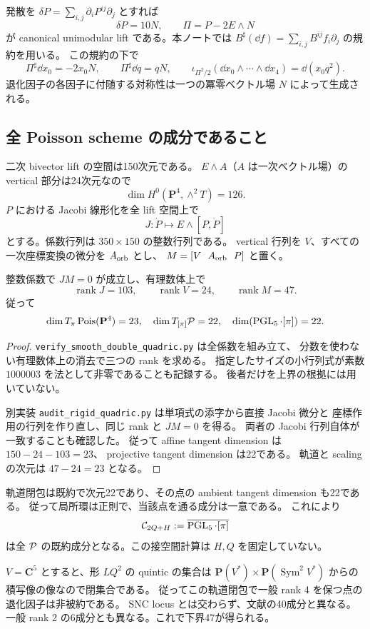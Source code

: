 \documentclass[11pt,a4paper]{ltjsarticle}
\newcommand{\PP}{\mathbf P}\renewcommand{\AA}{\mathbf A}\newcommand{\CC}{\mathbf C}\newcommand{\QQ}{\mathbf Q}
\DeclareMathOperator{\Pois}{Pois}\DeclareMathOperator{\rank}{rank}\DeclareMathOperator{\Spec}{Spec}
\DeclareMathOperator{\Sym}{Sym}
\theoremstyle{remark}\newtheorem{remark}[theorem]{注意}\renewcommand{\proofname}{証明}
\begin{document}
発散を $\delta P=\sum_{i,j}\partial_iP^{ij}\partial_j$ とすれば
\[
 \delta P=10N,\qquad \Pi=P-2E\wedge N
\]
が canonical unimodular lift である。本ノートでは
$B^\sharp(\dd f)=\sum_{i,j}B^{ij}f_i\partial_j$ の規約を用いる。
この規約の下で
\[
 \Pi^\sharp\dd x_0=-2x_0N,\qquad
 \Pi^\sharp\dd q=qN,\qquad
 \iota_{\Pi^2/2}(\dd x_0\wedge\cdots\wedge\dd x_4)=\dd(x_0q^2).
\]
退化因子の各因子に付随する対称性は一つの冪零ベクトル場 $N$ によって生成される。

\subsection{全 Poisson scheme の成分であること}
二次 bivector lift の空間は150次元である。
$E\wedge A$（$A$ は一次ベクトル場）の vertical 部分は24次元なので
\[
 \dim H^0(\PP^4,\wedge^2T)=126.
\]
$P$ における Jacobi 線形化を全 lift 空間上で
\[
 J:\dot P\longmapsto E\wedge[P,\dot P]
\]
とする。係数行列は $350\times150$ の整数行列である。
vertical 行列を $V$、すべての一次座標変換の微分を $A_{\rm orb}$ とし、
$M=[V\ \ A_{\rm orb}\ \ P]$ と置く。

\begin{proposition}[完全な接空間証明書]\label{prop:tangent}
整数係数で $JM=0$ が成立し、有理数体上で
\[
 \rank J=103,\qquad \rank V=24,\qquad \rank M=47.
\]
従って
\[
 \dim T_\pi\Pois(\PP^4)=23,\quad
 \dim T_{[\pi]}\cP=22,\quad
 \dim(\PGL_5\cdot[\pi])=22.
\]
\end{proposition}
\begin{proof}
\texttt{verify\_smooth\_double\_quadric.py} は全係数を組み立て、
分数を使わない有理数体上の消去で三つの rank を求める。
指定したサイズの小行列式が素数 $1000003$ を法として非零であることも記録する。
後者だけを上界の根拠には用いていない。

別実装 \texttt{audit\_rigid\_quadric.py} は単項式の添字から直接 Jacobi 微分と
座標作用の行列を作り直し、同じ rank と $JM=0$ を得る。
両者の Jacobi 行列自体が一致することも確認した。
従って affine tangent dimension は $150-24-103=23$、
projective tangent dimension は22である。
軌道と scaling の次元は $47-24=23$ となる。
\end{proof}

軌道閉包は既約で次元22であり、その点の ambient tangent dimension も22である。
従って局所環は正則で、当該点を通る成分は一意である。
これにより
\[
 \mathcal C_{2Q+H}:=\overline{\operatorname{PGL}_5\cdot[\pi]}
\]
は全 $\mathcal P$ の既約成分となる。この接空間計算は $H,Q$ を固定していない。

$V=\CC^5$ とすると、形 $LQ^2$ の quintic の集合は
$\PP(V^*)\times\PP(\Sym^2V^*)$ からの積写像の像なので閉集合である。
従ってこの軌道閉包で一般 rank 4 を保つ点の退化因子は非被約である。
SNC locus とは交わらず、文献の40成分と異なる。
一般 rank 2 の6成分とも異なる。これで下界47が得られる。
\end{document}
